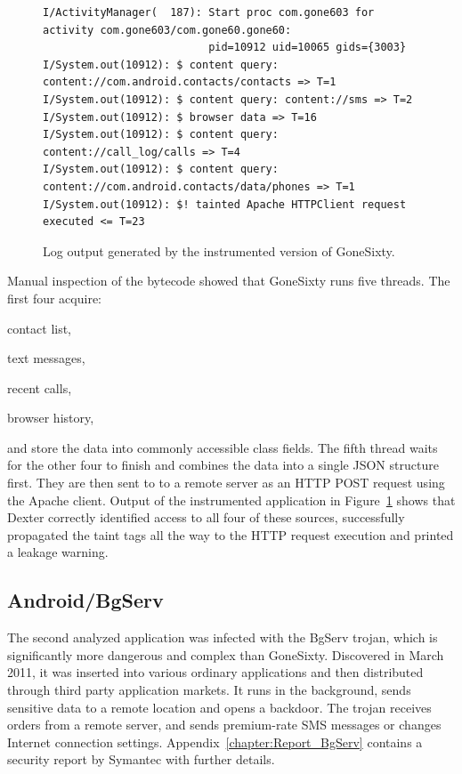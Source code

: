 \documentclass[12pt,twoside,notitlepage]{report}
\begin{document}
\begin{figure}[t]
	\scriptsize
	\begin{verbatim}
I/ActivityManager(  187): Start proc com.gone603 for activity com.gone603/com.gone60.gone60: 
                          pid=10912 uid=10065 gids={3003}
I/System.out(10912): $ content query: content://com.android.contacts/contacts => T=1
I/System.out(10912): $ content query: content://sms => T=2
I/System.out(10912): $ browser data => T=16
I/System.out(10912): $ content query: content://call_log/calls => T=4
I/System.out(10912): $ content query: content://com.android.contacts/data/phones => T=1
I/System.out(10912): $! tainted Apache HTTPClient request executed <= T=23
	\end{verbatim}
	\caption{Log output generated by the instrumented version of GoneSixty.}
	\label{figure:Evaluation_GoneSixty}
\end{figure}

Manual inspection of the bytecode showed that GoneSixty runs five threads. The first four acquire:
\begin{inparaenum}[(i)]
\item contact list,
\item text messages,
\item recent calls,
\item browser history,
\end{inparaenum}
and store the data into commonly accessible class fields. The fifth thread waits for the other four to finish and combines the data into a single JSON structure first. They are then sent to to a remote server as an HTTP POST request using the Apache client. Output of the instrumented application in Figure~\ref{figure:Evaluation_GoneSixty} shows that Dexter correctly identified access to all four of these sources, successfully propagated the taint tags all the way to the HTTP request execution and printed a leakage warning. 

\subsection{Android/BgServ}

The second analyzed application was infected with the BgServ trojan, which is significantly more dangerous and complex than GoneSixty. Discovered in March 2011, it was inserted into various ordinary applications and then distributed through third party application markets. It runs in the background, sends sensitive data to a remote location and opens a backdoor. The trojan receives orders from a remote server, and sends premium-rate SMS messages or changes Internet connection settings. Appendix~\ref{chapter:Report_BgServ} contains a security report by Symantec with further details. 
\end{document}

